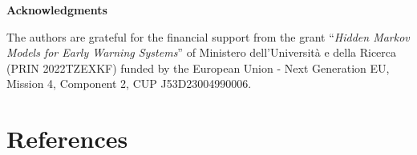 \textbf{Acknowledgments}

The authors are grateful for the financial support from the grant
``\emph{Hidden Markov Models for Early Warning Systems}'' of Ministero
dell'Università e della Ricerca (PRIN 2022TZEXKF) funded by the European
Union - Next Generation EU, Mission 4, Component 2, CUP J53D23004990006.

\hypertarget{references}{%
\section{References}\label{references}}

